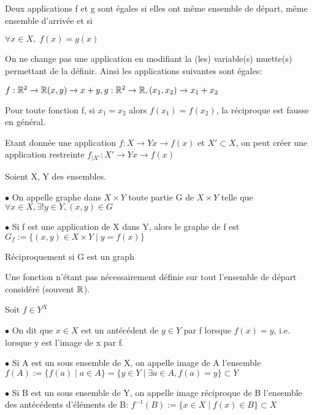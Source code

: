 \documentclass[a4paper, 12pt]{article}
\begin{document}
\begin{remark}
    Deux applications f et g sont égales si elles ont même ensemble de départ, même ensemble d'arrivée et si

    $\forall x \in X, \; f(x) = g(x)$
\end{remark}

\begin{remark}
    On ne change pas une application en modifiant la (les) variable(s) muette(s) permettant de la définir. Ainsi les applications suivantes sont égales:

    $f : \mathbb{R}^2 \to \mathbb{R} (x, y) \to x + y,     g : \mathbb{R}^2 \to \mathbb{R} , (x_1, x_2) \to x_1 + x_2$
\end{remark}

\begin{remark}
    Pour toute fonction f, si $x_1 = x_2$ alors $f(x_1) = f(x_2)$, la réciproque est fausse en général.
\end{remark}

\begin{remark}
    Etant donnée une application $f: X \to Y   x \to f(x)$ et $X' \subset X$, on peut créer une application restreinte $f_{\mid X'}: X' \to Y    x \to f(x)$
\end{remark}

\begin{definition}
    Soient X, Y des ensembles.

    \item $\bullet$ On appelle graphe dans $X \times Y$ toute partie G de $X \times Y$
    telle que $\forall x \in X, \exists! y \in Y, (x, y) \in G$

    \item $\bullet$ Si f est une application de X dans Y, alors le graphe de f est
    $G_f := \{(x, y) \in X \times Y \mid y = f(x)\}$
\end{definition}

\begin{remark}
    Réciproquement si G est un graph %
\end{remark}

\begin{remark}
    Une fonction n'étant pas nécessairement définie sur tout l'ensemble de départ considéré (souvent $\mathbb{R}$).
\end{remark}

\begin{definition}
    Soit $f \in Y^X$

    \item $\bullet$ On dit que $x \in X$ est un antécédent de $y \in Y$ par f lorsque $f(x) = y$, i.e. lorsque y est l'image de x par f.
    \item $\bullet$ Si A est un sous ensemble de X, on appelle image de A l'ensemble
    $f(A) := \{f(a) \mid a \in A\} = \{y \in Y \mid \exists a \in A, f(a) = y\} \subset Y$
    \item $\bullet$ Si B est un sous ensemble de Y, on appelle image réciproque de B l'ensemble des antécédents d'éléments de B:
    $f^{-1}(B) := \{x \in X \mid f(x) \in B\} \subset X$
\end{definition}
\end{document}
